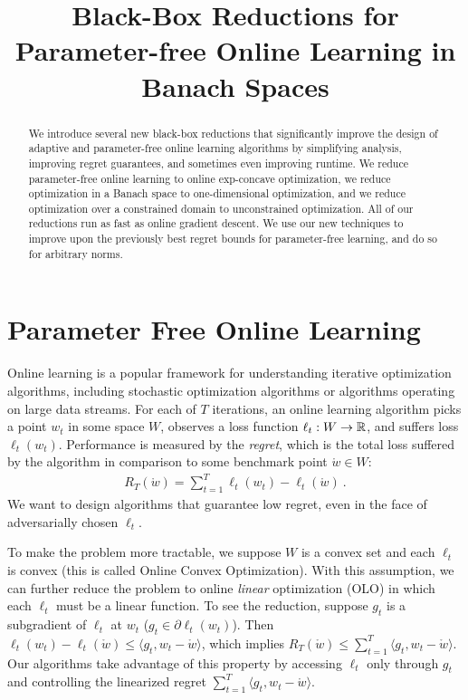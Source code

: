 \documentclass[12pt]{colt2018} %
\title{Black-Box Reductions for Parameter-free Online Learning in Banach Spaces}
\newcommand{\w}{\mathring{w}}
\begin{document}
\maketitle

\begin{abstract}
We introduce several new black-box reductions that significantly improve the design of adaptive and parameter-free online learning algorithms by simplifying analysis, improving regret guarantees, and sometimes even improving runtime. We reduce parameter-free online learning to online exp-concave optimization, we reduce optimization in a Banach space to one-dimensional optimization, and we reduce optimization over a constrained domain to unconstrained optimization. All of our reductions run as fast as online gradient descent. We use our new techniques to improve upon the previously best regret bounds for parameter-free learning, and do so for arbitrary norms.
\end{abstract}


\section{Parameter Free Online Learning}\label{sec:intro}

Online learning is a popular framework for understanding iterative optimization algorithms, including stochastic optimization algorithms or algorithms operating on large data streams. For each of $T$ iterations, an online learning algorithm picks a point $w_t$ in some space $W$, observes a loss function $\ell_t:W\to \mathbb{R}$, and suffers loss $\ell_t(w_t)$. Performance is measured by the \emph{regret}, which is the total loss suffered by the algorithm in comparison to some benchmark point $\w\in W$:
\begin{align*}
R_T(\w) = \sum_{t=1}^T \ell_t(w_t) - \ell_t(\w)~.
\end{align*}
We want to design algorithms that guarantee low regret, even in the face of adversarially chosen $\ell_t$.

To make the problem more tractable, we suppose $W$ is a convex set and each $\ell_t$ is convex (this is called Online Convex Optimization). With this assumption, we can further reduce the problem to online \emph{linear} optimization (OLO) in which each $\ell_t$ must be a linear function. To see the reduction, suppose $g_t$ is a subgradient of $\ell_t$ at $w_t$ ($g_t\in \partial \ell_t(w_t)$). Then $\ell_t(w_t)-\ell_t(\w)\le \langle g_t,w_t-\w\rangle$, which implies $R_T(\w)\le \sum_{t=1}^T \langle g_t,w_t-\w\rangle$. Our algorithms take advantage of this property by accessing $\ell_t$ only through $g_t$ and controlling the linearized regret $\sum_{t=1}^T \langle g_t,w_t-\w\rangle$.
\end{document}
